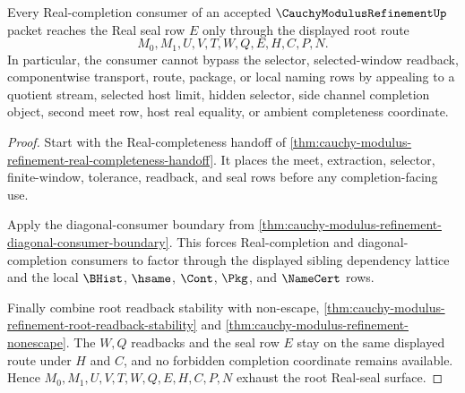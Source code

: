 \begin{theorem}
\label{thm:cauchy-modulus-refinement-root-real-seal-exhaustion}
Every Real-completion consumer of an accepted $\CauchyModulusRefinementUp$ packet reaches the Real seal row $E$ only through the displayed root route
$$
M_0,M_1,U,V,T,W,Q,E,H,C,P,N.
$$
In particular, the consumer cannot bypass the selector, selected-window readback, componentwise transport, route, package, or local naming rows by appealing to a quotient stream, selected host limit, hidden selector, side channel completion object, second meet row, host real equality, or ambient completeness coordinate.
\end{theorem}
\begin{proof}
Start with the Real-completeness handoff of \autoref{thm:cauchy-modulus-refinement-real-completeness-handoff}. It places the meet, extraction, selector, finite-window, tolerance, readback, and seal rows before any completion-facing use.

Apply the diagonal-consumer boundary from \autoref{thm:cauchy-modulus-refinement-diagonal-consumer-boundary}. This forces Real-completion and diagonal-completion consumers to factor through the displayed sibling dependency lattice and the local $\BHist$, $\hsame$, $\Cont$, $\Pkg$, and $\NameCert$ rows.

Finally combine root readback stability with non-escape, \autoref{thm:cauchy-modulus-refinement-root-readback-stability} and \autoref{thm:cauchy-modulus-refinement-nonescape}. The $W,Q$ readbacks and the seal row $E$ stay on the same displayed route under $H$ and $C$, and no forbidden completion coordinate remains available. Hence $M_0,M_1,U,V,T,W,Q,E,H,C,P,N$ exhaust the root Real-seal surface.
\end{proof}


